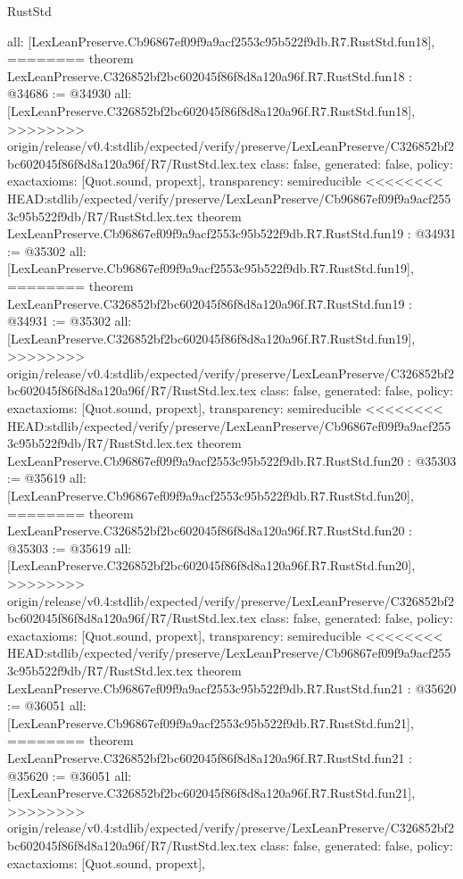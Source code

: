 \begin{lexlean}{RustStd}
\begin{coremodule}
{\begin{coremodule}
{{{{{{{{{{{{{{{{{{{{{  all: [LexLeanPreserve.Cb96867ef09f9a9acf2553c95b522f9db.R7.RustStd.fun18],
========
theorem LexLeanPreserve.C326852bf2bc602045f86f8d8a120a96f.R7.RustStd.fun18 : @34686 := @34930 {
  all: [LexLeanPreserve.C326852bf2bc602045f86f8d8a120a96f.R7.RustStd.fun18],
>>>>>>>> origin/release/v0.4:stdlib/expected/verify/preserve/LexLeanPreserve/C326852bf2bc602045f86f8d8a120a96f/R7/RustStd.lex.tex
  class: false,
  generated: false,
  policy: exact{axioms: [Quot.sound, propext]},
  transparency: semireducible
}
<<<<<<<< HEAD:stdlib/expected/verify/preserve/LexLeanPreserve/Cb96867ef09f9a9acf2553c95b522f9db/R7/RustStd.lex.tex
theorem LexLeanPreserve.Cb96867ef09f9a9acf2553c95b522f9db.R7.RustStd.fun19 : @34931 := @35302 {
  all: [LexLeanPreserve.Cb96867ef09f9a9acf2553c95b522f9db.R7.RustStd.fun19],
========
theorem LexLeanPreserve.C326852bf2bc602045f86f8d8a120a96f.R7.RustStd.fun19 : @34931 := @35302 {
  all: [LexLeanPreserve.C326852bf2bc602045f86f8d8a120a96f.R7.RustStd.fun19],
>>>>>>>> origin/release/v0.4:stdlib/expected/verify/preserve/LexLeanPreserve/C326852bf2bc602045f86f8d8a120a96f/R7/RustStd.lex.tex
  class: false,
  generated: false,
  policy: exact{axioms: [Quot.sound, propext]},
  transparency: semireducible
}
<<<<<<<< HEAD:stdlib/expected/verify/preserve/LexLeanPreserve/Cb96867ef09f9a9acf2553c95b522f9db/R7/RustStd.lex.tex
theorem LexLeanPreserve.Cb96867ef09f9a9acf2553c95b522f9db.R7.RustStd.fun20 : @35303 := @35619 {
  all: [LexLeanPreserve.Cb96867ef09f9a9acf2553c95b522f9db.R7.RustStd.fun20],
========
theorem LexLeanPreserve.C326852bf2bc602045f86f8d8a120a96f.R7.RustStd.fun20 : @35303 := @35619 {
  all: [LexLeanPreserve.C326852bf2bc602045f86f8d8a120a96f.R7.RustStd.fun20],
>>>>>>>> origin/release/v0.4:stdlib/expected/verify/preserve/LexLeanPreserve/C326852bf2bc602045f86f8d8a120a96f/R7/RustStd.lex.tex
  class: false,
  generated: false,
  policy: exact{axioms: [Quot.sound, propext]},
  transparency: semireducible
}
<<<<<<<< HEAD:stdlib/expected/verify/preserve/LexLeanPreserve/Cb96867ef09f9a9acf2553c95b522f9db/R7/RustStd.lex.tex
theorem LexLeanPreserve.Cb96867ef09f9a9acf2553c95b522f9db.R7.RustStd.fun21 : @35620 := @36051 {
  all: [LexLeanPreserve.Cb96867ef09f9a9acf2553c95b522f9db.R7.RustStd.fun21],
========
theorem LexLeanPreserve.C326852bf2bc602045f86f8d8a120a96f.R7.RustStd.fun21 : @35620 := @36051 {
  all: [LexLeanPreserve.C326852bf2bc602045f86f8d8a120a96f.R7.RustStd.fun21],
>>>>>>>> origin/release/v0.4:stdlib/expected/verify/preserve/LexLeanPreserve/C326852bf2bc602045f86f8d8a120a96f/R7/RustStd.lex.tex
  class: false,
  generated: false,
  policy: exact{axioms: [Quot.sound, propext]},
}}}}}}}}}}}}}}}}}}}}}}}}}
\end{coremodule}}
\end{coremodule}
\end{lexlean}
